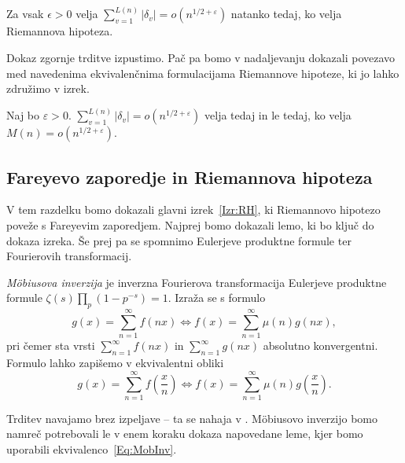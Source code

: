\documentclass[mat1]{fmfdelo}
\begin{document}
\begin{trditev}
Za vsak $\epsilon>0$ velja \( \sum_{v=1}^{L(n)}|\delta_{v}| = o(n^{1/2+\varepsilon}) \) natanko tedaj, ko velja Riemannova hipoteza.
\end{trditev}

Dokaz zgornje trditve izpustimo. Pač pa bomo v nadaljevanju dokazali povezavo med navedenima ekvivalenčnima formulacijama Riemannove hipoteze, ki jo lahko združimo v izrek.

\begin{izrek}
\label{Izr:RH}
Naj bo $\varepsilon > 0$. \( \sum_{v=1}^{L(n)}|\delta_{v}| = o(n^{1/2+\varepsilon}) \) velja tedaj in le tedaj, ko velja \( M(n) = o(n^{1/2+\varepsilon}). \)
\end{izrek}

\subsection{Fareyevo zaporedje in Riemannova hipoteza}

V tem razdelku bomo dokazali glavni izrek~\ref{Izr:RH}, ki Riemannovo hipotezo poveže s Fareyevim zaporedjem. Najprej bomo dokazali lemo, ki bo ključ do dokaza izreka. Še prej pa se spomnimo Eulerjeve produktne formule ter Fourierovih transformacij.

\begin{trditev}
\emph{M\"obiusova inverzija} je inverzna Fourierova transformacija Eulerjeve produktne formule \( \zeta(s) \prod_{p} (1-p^{-s}) = 1. \) 
Izraža se s formulo
\begin{equation}
g(x) = \sum_{n=1}^{\infty} f(nx) \Longleftrightarrow f(x) = \sum_{n=1}^{\infty} \mu(n) g(nx),
\end{equation}
pri čemer sta vrsti $\sum_{n=1}^{\infty} f(nx)$ in $\sum_{n=1}^{\infty} g(nx)$ absolutno konvergentni.
Formulo lahko zapišemo v ekvivalentni obliki
\begin{equation}
\label{Eq:MobInv}
g(x) = \sum_{n=1}^{\infty} f \left(\frac{x}{n} \right) \Longleftrightarrow f(x) = \sum_{n=1}^{\infty} \mu(n) g \left(\frac{x}{n} \right).
\end{equation}
%
\end{trditev}

Trditev navajamo brez izpeljave -- ta se nahaja v \cite[poglavje 10.9]{zetafunction}. M\"obiusovo inverzijo bomo namreč potrebovali le v enem koraku dokaza napovedane leme, kjer bomo uporabili ekvivalenco~\eqref{Eq:MobInv}.
\end{document}
